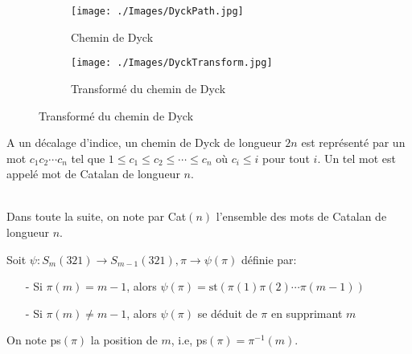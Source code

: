 \begin{figure}[h!]
	\centering
	\begin{subfigure}[b]{0.38\textwidth}
		\centering
		\texttt{[image: ./Images/DyckPath.jpg]}
		\caption{Chemin de Dyck}
	\end{subfigure}
	\hspace{2cm}
	\begin{subfigure}[b]{0.38\textwidth}
		\centering
		\texttt{[image: ./Images/DyckTransform.jpg]}
		\caption{Transformé du chemin de Dyck}
	\end{subfigure}
	\label{fig:DyckPath}
\end{figure}


\begin{definition}
	\begin{rm}
		A un décalage d'indice, un chemin de Dyck de longueur $2n$ est représenté par un mot $c_{1}c_{2}
			\cdots c_{n}$ tel que $1 \leq c_{1} \leq c_{2} \leq \cdots \leq c_{n}$ où $c_{i} \leq i$ pour
		tout $i$. Un tel mot est appelé mot de Catalan de longueur $n$.
	\end{rm}
\end{definition}
\text{}\\
Dans toute la suite, on note par Cat$(n)$ l'ensemble des mots de Catalan  de longueur $n$.


\begin{definition} \label{psiDef_}
	\begin{rm}
		Soit $\psi: S_{m}(321)\longrightarrow S_{m-1}(321), \pi \longrightarrow \psi(\pi)$ définie par:
		\begin{itemize}
			\item [-] Si $\pi(m)=m-1$, alors $\psi(\pi)=\text{st}(\pi(1)\pi(2)\cdots \pi(m-1))$
			\item [-] Si $\pi(m)\neq m-1$, alors $\psi(\pi)$ se déduit de $\pi$ en supprimant $m$
		\end{itemize}
		On note ps$(\pi)$ la position de $m$, i.e, ps$(\pi)=\pi^{-1}(m)$.
	\end{rm}
\end{definition}

